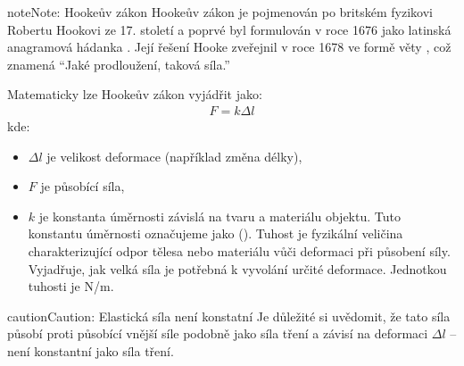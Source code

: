\documentclass[letterpaper,10pt,english]{jupyterBook}
\begin{document}
\begin{sphinxadmonition}{note}{Note:}
\sphinxAtStartPar
Hookeův zákon
Hookeův zákon je pojmenován po britském fyzikovi Robertu Hookovi ze 17. století a poprvé byl formulován v roce 1676 jako latinská anagramová hádanka . Její řešení Hooke zveřejnil v roce 1678 ve formě věty , což znamená “Jaké prodloužení, taková síla.”
\end{sphinxadmonition}

\sphinxAtStartPar
Matematicky lze Hookeův zákon vyjádřit jako:
\begin{equation*}
\begin{split}
F = k \Delta l
\end{split}
\end{equation*}
\sphinxAtStartPar
kde:
\begin{itemize}
\item {} 
\sphinxAtStartPar
\(\Delta l\) je velikost deformace (například změna délky),

\item {} 
\sphinxAtStartPar
\(F\) je působící síla,

\item {} 
\sphinxAtStartPar
\(k\) je konstanta úměrnosti závislá na tvaru a materiálu objektu. Tuto konstantu úměrnosti označujeme jako  (). Tuhost  je fyzikální veličina charakterizující odpor tělesa nebo materiálu vůči deformaci při působení síly. Vyjadřuje, jak velká síla je potřebná k vyvolání určité deformace. Jednotkou tuhosti je N/m.

\end{itemize}

\begin{sphinxadmonition}{caution}{Caution:}
\sphinxAtStartPar
Elastická síla není konstatní
Je důležité si uvědomit, že tato síla působí proti působící vnější síle podobně jako síla tření a závisí na deformaci \(\Delta l\) – není konstantní jako síla tření.
\end{sphinxadmonition}
\end{document}
